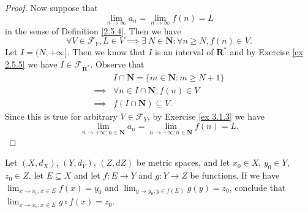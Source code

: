 \begin{proof}
    Now suppose that
    \[
        \lim_{n \to \infty} a_n = \lim_{n \to \infty} f(n) = L
    \]
    in the sense of Definition \ref{2.5.4}.
    Then we have
    \[
        \forall V \in \mathcal{F}_Y, L \in V \implies \exists\ N \in \mathbf{N} : \forall n \geq N, f(n) \in V.
    \]
    Let \(I = (N, +\infty]\).
    Then we know that \(I\) is an interval of \(\mathbf{R}^*\) and by Exercise \ref{ex 2.5.5} we have \(I \in \mathcal{F}_{\mathbf{R}^*}\).
    Observe that
    \begin{align*}
                 & I \cap \mathbf{N} = \{m \in \mathbf{N} : m \geq N + 1\} \\
        \implies & \forall n \in I \cap \mathbf{N}, f(n) \in V             \\
        \implies & f(I \cap \mathbf{N}) \subseteq V.
    \end{align*}
    Since this is true for arbitrary \(V \in \mathcal{F}_Y\), by Exercise \ref{ex 3.1.3} we have
    \[
        \lim_{n \to +\infty ; n \in \mathbf{N}} a_n = \lim_{n \to +\infty ; n \in \mathbf{N}} f(n) = L.
    \]
\end{proof}

\begin{exercise}\label{ex 3.1.5}
    Let \((X, d_X)\), \((Y, d_Y)\), \((Z, d Z)\) be metric spaces, and let \(x_0 \in X\), \(y_0 \in Y\), \(z_0 \in Z\).
    let \(E \subseteq X\) and let \(f : E \to Y\) and \(g : Y \to Z\) be functions.
    If we have \(\lim_{x \to x_0 ; x \in E} f(x) = y_0\) and \(\lim_{y \to y_0 ; y \in f(E)} g(y) = z_0\), conclude that \(\lim_{x \to x_0 ; x \in E} g \circ f(x) = z_0\).
\end{exercise}

